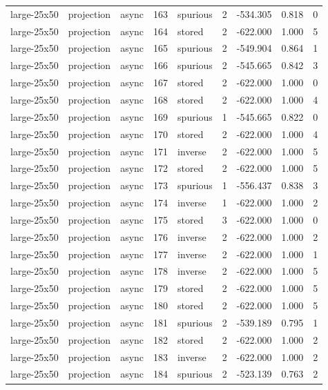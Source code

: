 \begin{tabular}{lllrlrrrr}
large-25x50 & projection & async & 163 & spurious & 2 & -534.305 & 0.818 & 0 \\
large-25x50 & projection & async & 164 & stored & 2 & -622.000 & 1.000 & 5 \\
large-25x50 & projection & async & 165 & spurious & 2 & -549.904 & 0.864 & 1 \\
large-25x50 & projection & async & 166 & spurious & 2 & -545.665 & 0.842 & 3 \\
large-25x50 & projection & async & 167 & stored & 2 & -622.000 & 1.000 & 0 \\
large-25x50 & projection & async & 168 & stored & 2 & -622.000 & 1.000 & 4 \\
large-25x50 & projection & async & 169 & spurious & 1 & -545.665 & 0.822 & 0 \\
large-25x50 & projection & async & 170 & stored & 2 & -622.000 & 1.000 & 4 \\
large-25x50 & projection & async & 171 & inverse & 2 & -622.000 & 1.000 & 5 \\
large-25x50 & projection & async & 172 & stored & 2 & -622.000 & 1.000 & 5 \\
large-25x50 & projection & async & 173 & spurious & 1 & -556.437 & 0.838 & 3 \\
large-25x50 & projection & async & 174 & inverse & 1 & -622.000 & 1.000 & 2 \\
large-25x50 & projection & async & 175 & stored & 3 & -622.000 & 1.000 & 0 \\
large-25x50 & projection & async & 176 & inverse & 2 & -622.000 & 1.000 & 2 \\
large-25x50 & projection & async & 177 & inverse & 2 & -622.000 & 1.000 & 1 \\
large-25x50 & projection & async & 178 & inverse & 2 & -622.000 & 1.000 & 5 \\
large-25x50 & projection & async & 179 & stored & 2 & -622.000 & 1.000 & 5 \\
large-25x50 & projection & async & 180 & stored & 2 & -622.000 & 1.000 & 5 \\
large-25x50 & projection & async & 181 & spurious & 2 & -539.189 & 0.795 & 1 \\
large-25x50 & projection & async & 182 & stored & 2 & -622.000 & 1.000 & 2 \\
large-25x50 & projection & async & 183 & inverse & 2 & -622.000 & 1.000 & 2 \\
large-25x50 & projection & async & 184 & spurious & 2 & -523.139 & 0.763 & 2 \\

\end{tabular}
